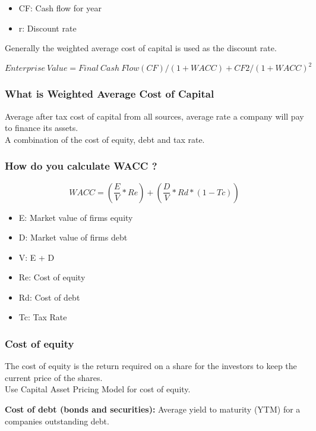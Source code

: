 \documentclass[11pt]{scrartcl} %
\begin{document}
\begin{itemize}
	\item CF: Cash flow for year
	\item r: Discount rate
\end{itemize}

Generally the weighted average cost of capital is used as the discount rate.

\[ Enterprise\:Value = Final\:Cash\:Flow(CF)/(1+WACC) + CF2/(1+WACC)^2 \]

\subsubsection{What is Weighted Average Cost of Capital}

Average after tax cost of capital from all sources, average rate a company will pay to finance its assets.\\

A combination of the cost of equity, debt and tax rate.

\subsubsection{How do you calculate WACC ?}

\begin{equation}
	WACC = (\frac{E}{V}*Re) + (\frac{D}{V}*Rd*(1-Tc))
\end{equation}

\begin{itemize}
	\item E: Market value of firms equity
	\item D: Market value of firms debt
	\item V: E + D
	\item Re: Cost of equity
	\item Rd: Cost of debt
	\item Tc: Tax Rate 
\end{itemize}

\subsubsection{Cost of equity}

The cost of equity is the return required on a share for the investors to keep the current price of the shares.\\

Use Capital Asset Pricing Model for cost of equity.

\textbf{Cost of debt (bonds and securities):} Average yield to maturity (YTM) for a companies outstanding debt.
\end{document}
